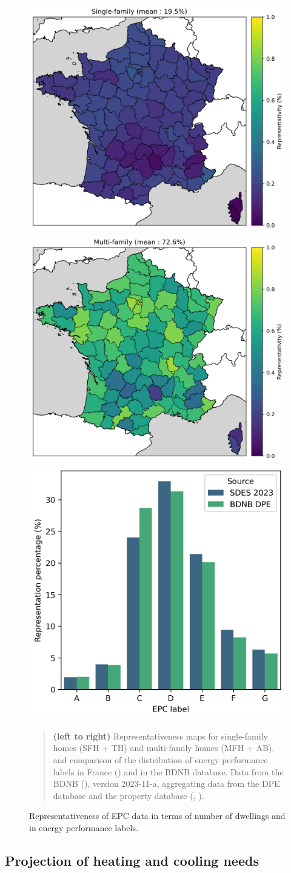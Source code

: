 \documentclass[11pt]{article}
\begin{document}
    \begin{figure}[ht]
        \centering
        \includegraphics[width=0.32\columnwidth]{figures/carte_repr_maison_dpe_nblog-BDNB.png}
        \includegraphics[width=0.32\columnwidth]{figures/carte_repr_appartement_dpe_nblog-BDNB.png}
        \includegraphics[width=0.32\columnwidth]{figures/DPE_distribution_dpe_france.png}
        \caption{\label{fig:epc} Representativeness of EPC data in terms of number of dwellings and in energy performance labels.}
        \begin{quote}
            \vspace{-2mm}
            \small\noindent
            \textbf{(left to right)} Representativeness maps for single-family homes (SFH + TH) and multi-family homes (MFH + AB), and comparison of the distribution of energy performance labels in France (\cite{onre_parc_2022}) and in the BDNB database. Data from the BDNB (\cite{cstb_base_2024}), version 2023-11-a, aggregating data from the DPE database and the property database (\cite{ademe_donnees_2024}, \cite{cerema_documentation_2024}). 
        \end{quote}
    \end{figure}

    \subsection{Projection of heating and cooling needs} %
    \label{sub:evolution_des_besoins_énergétiques}
    
\end{document}

